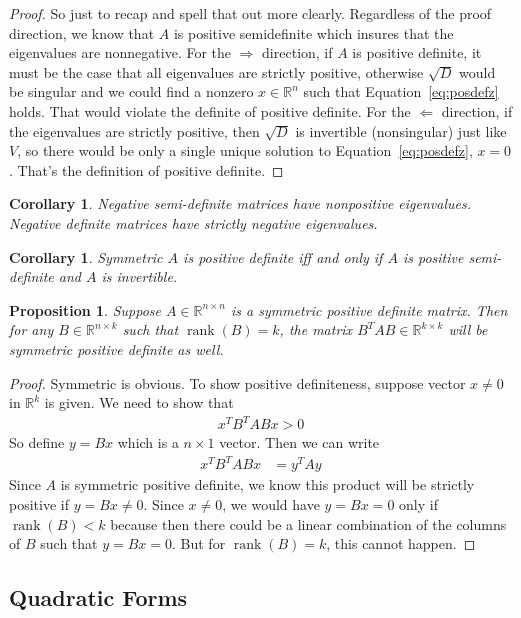 \documentclass[12pt]{article}
\numberwithin{equation}{section} %
\theoremstyle{plain}
\newtheorem{prop}[thm]{Proposition}
\newtheorem{cor}[thm]{Corollary}
\theoremstyle{definition}
\theoremstyle{remark}
\newcommand{\Rn}{\mathbb{R}^n}
\newcommand{\Rk}{\mathbb{R}^k}
\newcommand{\Rnn}{\mathbb{R}^{n\times n}}
\newcommand{\Rnk}{\mathbb{R}^{n\times k}}
\newcommand{\Rkk}{\mathbb{R}^{k\times k}}
\newcommand{\rank}{\operatorname{rank}}
\begin{document}
\begin{proof}
So just to recap and spell that out more clearly. Regardless of the
proof direction, we know that $A$ is positive semidefinite which insures
that the eigenvalues are nonnegative. For the $\Rightarrow$ direction,
if $A$ is positive definite, it must be the case that all eigenvalues
are strictly positive, otherwise $\sqrt{D}$ would be singular and we
could find a nonzero $x\in\Rn$ such that Equation~\ref{eq:posdefz}
holds. That would violate the definite of positive definite.
For the $\Leftarrow$ direction, if the eigenvalues are strictly
positive, then $\sqrt{D}$ is invertible (nonsingular) just like $V$, so
there would be only a single unique solution to
Equation~\ref{eq:posdefz}, $x=0$. That's the definition of positive
definite.
\end{proof}

\begin{cor}
Negative semi-definite matrices have nonpositive eigenvalues. Negative
definite matrices have strictly negative eigenvalues.
\end{cor}

\begin{cor}
Symmetric $A$ is positive definite iff and only if $A$ is positive
\emph{semi}-definite and $A$ is invertible.
\end{cor}

\begin{prop}
Suppose $A\in\Rnn$ is a symmetric positive definite matrix. Then for any
$B\in\Rnk$ such that $\rank(B)=k$, the matrix $B^TAB\in\Rkk$ will be
symmetric positive definite as well.
\end{prop}
\begin{proof}
Symmetric is obvious. To show positive definiteness,
suppose vector $x \neq 0$ in $\Rk$ is given. We need to show that
\begin{align*}
  x^T B^TABx >0
\end{align*}
So define $y=Bx$ which is a $n\times 1$ vector. Then we can write
\begin{align*}
  x^TB^TABx &= y^TAy
\end{align*}
Since $A$ is symmetric positive definite, we know this product will be
strictly positive if $y=Bx\neq 0$. Since $x\neq 0$, we would have
$y=Bx=0$ only if $\rank(B)<k$ because then there could be a linear
combination of the columns of $B$ such that $y=Bx=0$. But for
$\rank(B)=k$, this cannot happen.
\end{proof}


\clearpage
\subsection{Quadratic Forms}
\end{document}
